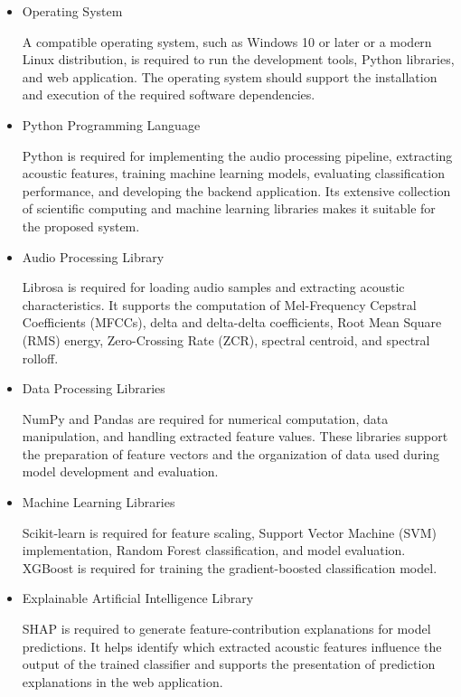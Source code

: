 \documentclass[12pt,a4paper]{report}
\begin{document}
\begin{itemize}

    \item Operating System

    A compatible operating system, such as Windows 10 or later or a modern Linux distribution, is required to run the development tools, Python libraries, and web application. The operating system should support the installation and execution of the required software dependencies.

    \item Python Programming Language

    Python is required for implementing the audio processing pipeline, extracting acoustic features, training machine learning models, evaluating classification performance, and developing the backend application. Its extensive collection of scientific computing and machine learning libraries makes it suitable for the proposed system.

    \item Audio Processing Library

    Librosa is required for loading audio samples and extracting acoustic characteristics. It supports the computation of Mel-Frequency Cepstral Coefficients (MFCCs), delta and delta-delta coefficients, Root Mean Square (RMS) energy, Zero-Crossing Rate (ZCR), spectral centroid, and spectral rolloff.

    \item Data Processing Libraries

    NumPy and Pandas are required for numerical computation, data manipulation, and handling extracted feature values. These libraries support the preparation of feature vectors and the organization of data used during model development and evaluation.

    \item Machine Learning Libraries

    Scikit-learn is required for feature scaling, Support Vector Machine (SVM) implementation, Random Forest classification, and model evaluation. XGBoost is required for training the gradient-boosted classification model. 
    \item Explainable Artificial Intelligence Library

    SHAP is required to generate feature-contribution explanations for model predictions. It helps identify which extracted acoustic features influence the output of the trained classifier and supports the presentation of prediction explanations in the web application.


\end{itemize}
\end{document}
